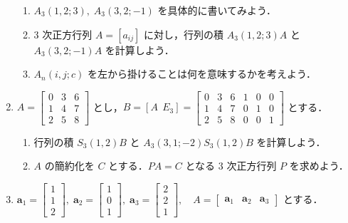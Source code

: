 \documentclass[11pt, uplatex, dvipdfmx]{jsarticle}
\begin{document}
\begin{enumerate}[label=\ref{sec:transform}.\arabic*]
\begin{enumerate}[label=(\arabic*)]
  \item $A_3(1,2 ; 3), \; A_3(3, 2; -1)$ を具体的に書いてみよう．

  \item $3$ 次正方行列 $A=\left[ a_{ij}\right]$ に対し，行列の積 $A_3(1,2; 3)A$ と $A_3(3,2; -1)A$ を計算しよう．

  \item $A_n(i,j; c)$ を左から掛けることは何を意味するかを考えよう．
  \end{enumerate}

\item $A=\left[
    \begin{array}{rrr}
      0 & 3 & 6\\
      1 & 4 & 7\\
      2 & 5 & 8
    \end{array}
  \right]$ とし，$B=\left[ A \  \ E_3\right] = \left[
    \begin{array}{rrrrrr}
      0 & 3 & 6 & 1 & 0 & 0\\
      1 & 4 & 7 & 0 & 1 & 0\\
      2 & 5 & 8 & 0 & 0 & 1
    \end{array}
  \right]$ とする．

  \vspace{1zh}

  \begin{enumerate}[label=(\arabic*)]
    \setlength{\itemsep}{1ex}
    
  \item 行列の積 $S_3(1,2) B$ と $A_3(3,1; -2) S_3(1,2)B$ を計算しよう．

  \item $A$ の簡約化を $C$ とする．$PA=C$ となる $3$ 次正方行列 $P$ を求めよう．
    
  \end{enumerate}
  
\item $\bm{a}_1=\left[
    \begin{array}{r}
      1\\
      1\\
      2
    \end{array}
  \right], \; \bm{a}_2=\left[
    \begin{array}{r}
      1\\
      0\\
      1
    \end{array}
  \right], \; \bm{a}_3=\left[
    \begin{array}{r}
      2\\
      2\\
      1
    \end{array}
  \right], \quad A=\left[
    \begin{array}{ccc}
      \bm{a}_1 & \bm{a}_2 & \bm{a}_3
    \end{array}
  \right]$ とする．


\end{enumerate}
\end{document}

